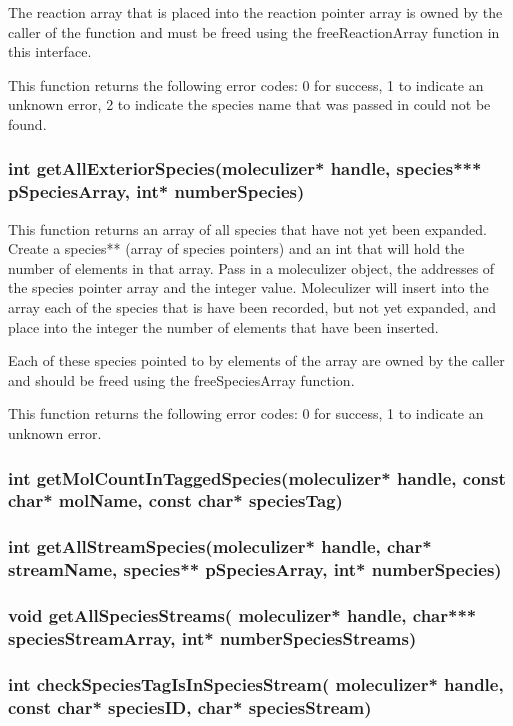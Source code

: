 The reaction array that is placed into the reaction pointer array is
owned by the caller of the function and must be freed using the
freeReactionArray function in this interface.

This function returns the following error codes: 0 for success, 1 to
indicate an unknown error, 2 to indicate the species name that was
passed in could not be found.

\subsubsection{int getAllExteriorSpecies(moleculizer* handle,
  species*** pSpeciesArray, int* numberSpecies)}

This function returns an array of all species that have not yet been
expanded.  Create a species** (array of species pointers) and an int
that will hold the number of elements in that array.  Pass in a
moleculizer object, the addresses of the species pointer array and the
integer value.  Moleculizer will insert into the array each of the
species that is have been recorded, but not yet expanded, and place
into the integer the number of elements that have been inserted.  

Each of these species pointed to by elements of the array are owned by
the caller and should be freed using the freeSpeciesArray function.

This function returns the following error codes: 0 for success, 1 to
indicate an unknown error.  

\subsubsection{int getMolCountInTaggedSpecies(moleculizer* handle, const char* molName, const char* speciesTag)}

\subsubsection{int getAllStreamSpecies(moleculizer* handle, char*
  streamName, species** pSpeciesArray, int* numberSpecies)}

\subsubsection{void getAllSpeciesStreams( moleculizer* handle, char*** speciesStreamArray, int* numberSpeciesStreams)}

\subsubsection{int checkSpeciesTagIsInSpeciesStream( moleculizer* handle, const char* speciesID, char* speciesStream)}

